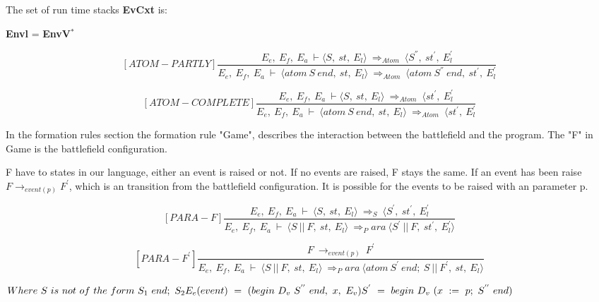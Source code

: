    	The set of run time stacks \textbf{EvCxt} is:
   	
   	\textbf{Envl} = \textbf{EnvV}\begin{math}
   	^*
   	\end{math}
   	
   	\[
   	[ATOM-PARTLY]
   	\dfrac{E_e, \ E_f, \ E_a \ \vdash \langle S, \ st, \ E_l \rangle \ \Rightarrow_{Atom} \ \langle S^{''}, \ st^{'}, \ E_l^{'}}{E_e, \ E_f, \ E_a \ \vdash \ \langle atom \ S \ end, \ st, \ E_l \rangle \ \Rightarrow_{Atom} \ \langle atom \ S^{''} \ end, \ st^{'}, \ E_l^{'}}
   	\]
   	
   	\[
   	[ATOM-COMPLETE]
   	\dfrac{E_e, \ E_f, \ E_a \ \vdash \langle S, \ st, \ E_l \rangle \ \Rightarrow_{Atom} \ \langle st^{'}, \ E_l^{'}}{E_e, \ E_f, \ E_a \ \vdash \ \langle atom \ S \ end, \ st, \ E_l \rangle \ \Rightarrow_{Atom} \ \langle st^{'}, \ E_l^{'}}
   	\]
   	
   	In the formation rules section the formation rule "Game", describes the interaction between the battlefield and the program. The "F" in Game is the battlefield configuration. 
   	
   	F have to states in our language, either an event is raised or not. If no events are raised, F stays the same. If an event has been raise \begin{math} F \rightarrow_{event(p)} F^{'} \end{math}, which is an transition from the battlefield configuration. It is possible for the events to be raised with an parameter p. 
   	
   	\[
   	[PARA-F]
   	\dfrac{E_e, \ E_f, \ E_a \ \vdash \ \langle S, \ st, \ E_l \rangle \ \Rightarrow_S \ \langle S^{'}, \ st^{'}, \ E_l^{'}}{E_e, \ E_f, \ E_a \ \vdash \ \langle S \ || \ F, \ st, \ E_l \rangle \ \Rightarrow_Para \ \langle S^{'} \ || \ F, \ st^{'}, \ E_l^{'} \rangle}
   	\]
   	
   	\[
   	[PARA-F^{'}]
   	\dfrac{F \ \rightarrow_{event(p)} \ F^{'}}{E_e, \ E_f, \ E_a \ \vdash \ \langle S \ || \ F, \ st, \ E_l \rangle \ \Rightarrow_Para \ \langle atom \ S^{'} \ end; \ S \ || \ F^{'}, \ st, \ E_l \rangle}
   	\]
   	
   	\begin{math}
   		Where \ S \ is \ not \ of \ the \ form \ S_1 \ end; \ S_2 \newline
	   	E_e(event) \ = \ (begin \ D_v \ S^{''} \ end, \ x, \ E_v) \newline
	   	S^{'} \ = \ begin \ D_v \ (x \ := \ p; \ S^{''} \ end)
   	\end{math}
   	
